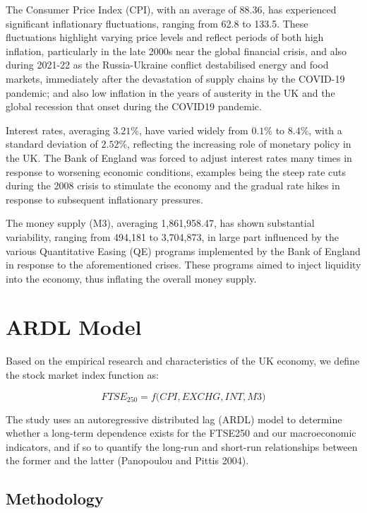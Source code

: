 \documentclass[12pt,a4paper]{article}
\begin{document}
The Consumer Price Index (CPI), with an average of 88.36, has 
experienced significant inflationary fluctuations, ranging from 
62.8 to 133.5. These fluctuations highlight varying price levels and 
reflect periods of both high inflation, particularly in the late 2000s 
near the global financial crisis, and also during 2021-22 as the Russia-Ukraine
conflict destabilised energy and food markets, immediately after the devastation 
of supply chains by the COVID-19 pandemic; and also low inflation in the 
years of austerity in the UK and the global recession that onset during 
the COVID19 pandemic. 

Interest rates, averaging $3.21\%$, have varied widely from $0.1\%$ to $8.4\%$, with a standard deviation of $2.52\%$, reflecting the 
increasing role of monetary policy in the UK. The Bank of England was forced to adjust interest rates 
many times in response to worsening economic conditions, examples being the steep rate cuts during the 2008 crisis to stimulate the economy and the gradual rate hikes in response to subsequent inflationary pressures. 

The money supply (M3), averaging 1,861,958.47, has shown substantial variability, ranging from 494,181 to 3,704,873, 
in large part influenced by the various Quantitative Easing (QE) programs implemented by the Bank of England 
in response to the aforementioned crises. These programs aimed to inject liquidity into the economy, thus inflating the overall money supply.

\section{ARDL Model}

Based on the empirical research and characteristics of the UK economy, we 
define the stock market index function as:

\begin{equation}
    FTSE_{250} = f\biggl(CPI, EXCHG, INT, M3\biggr)
\end{equation}

The study uses an autoregressive distributed lag (ARDL) model to determine 
whether a long-term dependence exists for the FTSE250 and our macroeconomic 
indicators, and if so to quantify the long-run and short-run relationships
between the former and the latter (Panopoulou and Pittis 2004).

\subsection{Methodology}
\end{document}
